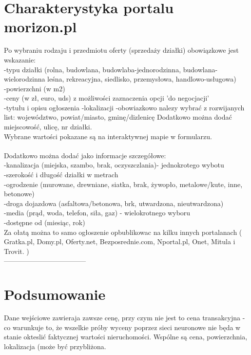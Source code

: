 \documentclass[a4paper,12pt,twoside,openany]{report}
\begin{document}
\section{Charakterystyka portalu morizon.pl}
Po wybraniu rodzaju i przedmiotu oferty (sprzedaży działki) obowiązkowe jest wskazanie:\\
-typu działki (rolna, budowlana, budowlaba-jednorodzinna, budowlana-wielorodzinna leśna, rekreacyjna, siedlisko, przemysłowa, handlowo-usługowa)\\

-powierzchni (w m2)\\
-ceny (w zł, euro, uds) z możliwości zaznaczenia opcji 'do negocjacji'\\
-tytułu i opisu ogłoszenia
-lokalizacji -obowiazkowo nalezy wybrać z rozwijanych list: województwo, powiat/miasto, gminę/dizlenicę
Dodatkowo można dodać miejscowość, ulicę, nr działki.\\
Wybrane wartości pokazane są na interaktywnej mapie w formularzu.\\
\\

Dodatkowo można dodać jako informacje szczegółowe:\\
-kanalizacja (miejska, szambo, brak, oczyszczlania)- jednokrotego wybotu\\
-szerokość i długość działki w metrach\\
-ogrodzenie (murowane, drewniane, siatka, brak, żywopło, metalowe/kute, inne, betonowe)\\
-droga dojazdowa (asfaltowa/betonowa, brk, utwardzona, nieutwardzona)\\
-media (prąd, woda, telefon, siła, gaz) - wielokrotnego wyboru\\
-dostępne od (miesiąc, rok)\\

Za ołatą można to samo ogłoszenie opbublikowac na kilku innych portalanach ( Gratka.pl, Domy.pl, Oferty.net, Bezposrednie.com, Nportal.pl, Onet, Mitula i Trovit. )\\

------------------------------------
\section{Podsumowanie}

Dane wejściowe zawieraja zawsze cenę, przy czym nie jest to cena transakcyjna - co warunkuje to, że wszelkie próby wyceny poprzez sieci neuronowe nie będa w stanie okteslić faktycznej wartości nieruchomości.
Wspólne są cena, powierzchnia, lokalizacja (może być przybliżona.\\
\end{document}
